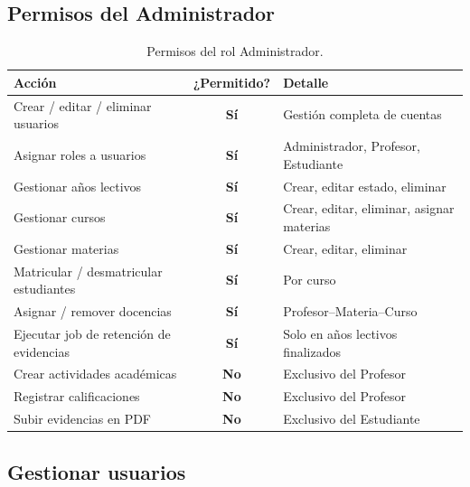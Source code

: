 \documentclass[12pt, a4paper]{article}
\newcommand{\puede}{\textcolor{yescolor}{\textbf{Sí}}}
\newcommand{\nopuede}{\textcolor{nocolor}{\textbf{No}}}
\begin{document}
\subsection{Permisos del Administrador}

\begin{table}[H]
    \centering
    \begin{tabular}{p{5cm} c p{7cm}}
        \toprule
        \textbf{Acción} & \textbf{¿Permitido?} & \textbf{Detalle} \\
        \midrule
        Crear / editar / eliminar usuarios     & \puede    & Gestión completa de cuentas \\
        Asignar roles a usuarios               & \puede    & Administrador, Profesor, Estudiante \\
        Gestionar años lectivos                & \puede    & Crear, editar estado, eliminar \\
        Gestionar cursos                       & \puede    & Crear, editar, eliminar, asignar materias \\
        Gestionar materias                     & \puede    & Crear, editar, eliminar \\
        Matricular / desmatricular estudiantes & \puede    & Por curso \\
        Asignar / remover docencias            & \puede    & Profesor--Materia--Curso \\
        Ejecutar job de retención de evidencias & \puede   & Solo en años lectivos finalizados \\
        Crear actividades académicas           & \nopuede  & Exclusivo del Profesor \\
        Registrar calificaciones               & \nopuede  & Exclusivo del Profesor \\
        Subir evidencias en PDF                & \nopuede  & Exclusivo del Estudiante \\
        \bottomrule
    \end{tabular}
    \caption{Permisos del rol Administrador.}
\end{table}

\subsection{Gestionar usuarios}
\end{document}
